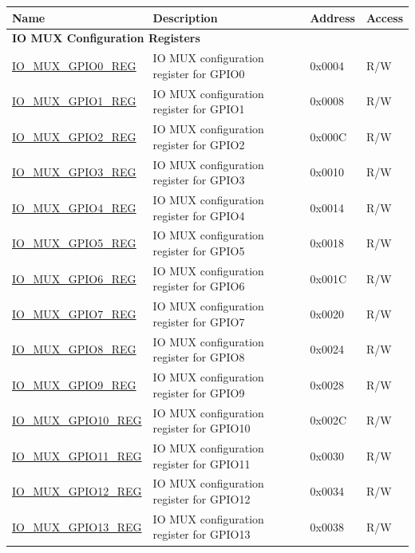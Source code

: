 \begin{longtable}{ | p{6cm} | p{7.2cm} | p{1.3cm} | p{1cm} | }
\hline\rowcolor{lightgray}
\textbf{Name} & \textbf{Description} &  \textbf{Address} & \textbf{Access} \\ \hline
\endhead
\multicolumn{4}{|l|}{\textbf{IO MUX Configuration Registers}} \\ \hline
\hyperref[regdesc:IOMUXGPIONREG]{IO\_MUX\_GPIO0\_REG} & IO MUX configuration register for GPIO0 & 0x0004 & R/W \\ \hline
\hyperref[regdesc:IOMUXGPIONREG]{IO\_MUX\_GPIO1\_REG} & IO MUX configuration register for GPIO1 & 0x0008 & R/W \\ \hline
\hyperref[regdesc:IOMUXGPIONREG]{IO\_MUX\_GPIO2\_REG} & IO MUX configuration register for GPIO2 & 0x000C & R/W \\ \hline
\hyperref[regdesc:IOMUXGPIONREG]{IO\_MUX\_GPIO3\_REG} & IO MUX configuration register for GPIO3 & 0x0010 & R/W \\ \hline
\hyperref[regdesc:IOMUXGPIONREG]{IO\_MUX\_GPIO4\_REG} & IO MUX configuration register for GPIO4 & 0x0014 & R/W \\ \hline
\hyperref[regdesc:IOMUXGPIONREG]{IO\_MUX\_GPIO5\_REG} & IO MUX configuration register for GPIO5 & 0x0018 & R/W \\ \hline
\hyperref[regdesc:IOMUXGPIONREG]{IO\_MUX\_GPIO6\_REG} & IO MUX configuration register for GPIO6 & 0x001C & R/W \\ \hline
\hyperref[regdesc:IOMUXGPIONREG]{IO\_MUX\_GPIO7\_REG} & IO MUX configuration register for GPIO7 & 0x0020 & R/W \\ \hline
\hyperref[regdesc:IOMUXGPIONREG]{IO\_MUX\_GPIO8\_REG} & IO MUX configuration register for GPIO8 & 0x0024 & R/W \\ \hline
\hyperref[regdesc:IOMUXGPIONREG]{IO\_MUX\_GPIO9\_REG} & IO MUX configuration register for GPIO9 & 0x0028 & R/W \\ \hline
\hyperref[regdesc:IOMUXGPIONREG]{IO\_MUX\_GPIO10\_REG} & IO MUX configuration register for GPIO10 & 0x002C & R/W \\ \hline
\hyperref[regdesc:IOMUXGPIONREG]{IO\_MUX\_GPIO11\_REG} & IO MUX configuration register for GPIO11 & 0x0030 & R/W \\ \hline
\hyperref[regdesc:IOMUXGPIONREG]{IO\_MUX\_GPIO12\_REG} & IO MUX configuration register for GPIO12 & 0x0034 & R/W \\ \hline
\hyperref[regdesc:IOMUXGPIONREG]{IO\_MUX\_GPIO13\_REG} & IO MUX configuration register for GPIO13 & 0x0038 & R/W \\ \hline

\end{longtable}
